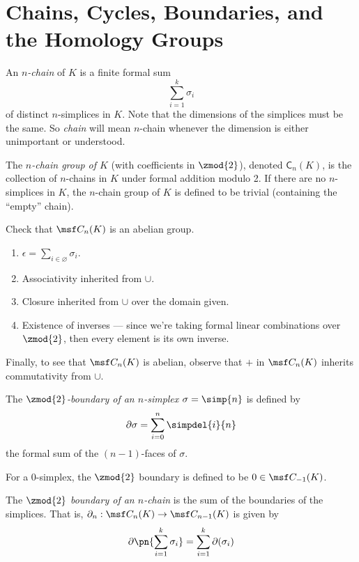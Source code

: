 \section{Chains, Cycles, Boundaries, and the Homology Groups}
\begin{definition}[$n$-chain]
  An \emph{$n$-chain} of $K$ is a finite formal sum
  \[
    \sum_{i=1}^k \sigma_i
  \]
  of distinct $n$-simplices in $K$. Note that the dimensions of the simplices
  must be the same. So \emph{chain} will mean $n$-chain whenever the dimension
  is either unimportant or understood.
\end{definition}
\begin{definition}
  The \emph{$n$-chain group of $K$} (with coefficients in $\zmod{2}$), denoted
  $\mathsf{C}_n(K)$, is the collection of $n$-chains in $K$ under formal
  addition modulo 2. If there are no $n$-simplices in $K$, the $n$-chain group
  of $K$ is defined to be trivial (containing the ``empty'' chain).
\end{definition}
\begin{problem}[16.1]
  Check that $\msf C_n(K)$ is an abelian group.
\end{problem}
\begin{solution}
  \begin{enumerate}[label=(\arabic*)]
  \item $\epsilon = \sum_{i \in \varnothing} \sigma_i$.
  \item Associativity inherited from $\cup$.
  \item Closure inherited from $\cup$ over the domain given.
  \item Existence of inverses --- since we're taking formal linear
    combinations over $\zmod{2}$, then every element is its own inverse.
  \end{enumerate}
  Finally, to see that $\msf C_n(K)$ is abelian, observe that $+$ in $\msf
  C_n(K)$ inherits commutativity from $\cup$.
\end{solution}
\begin{definition}
  The \emph{$\zmod{2}$-boundary of an $n$-simplex $\sigma = \simp{n}$} is
  defined by
  \[
    \partial \sigma = \sum_{i=0}^n \simpdel{i}{n}
  \]
  the formal sum of the $(n-1)$-faces of $\sigma$.

  For a 0-simplex, the $\zmod{2}$ boundary is defined to be $0 \in \msf
  C_{-1}(K)$.
\end{definition}
\begin{definition}
  The \emph{$\zmod{2}$ boundary of an $n$-chain} is the sum of the boundaries of
  the simplices. That is, $\partial_n : \msf C_n(K) \to \msf C_{n-1}(K)$ is
  given by
  \[
    \partial\pn{\sum_{i=1}^k \sigma_i} = \sum_{i=1}^k \partial(\sigma_i)
  \]
\end{definition}
